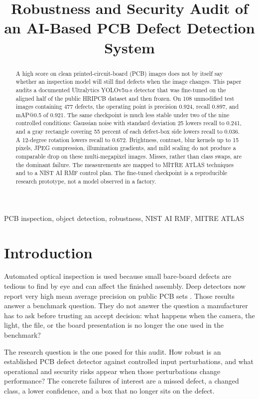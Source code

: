 \documentclass[conference]{IEEEtran}
\title{Robustness and Security Audit of an AI-Based PCB Defect Detection System}
\author{
\IEEEauthorblockN{Nirupam Narayana Maladi and Surbhi Singh}
\IEEEauthorblockA{Department of Computer Engineering\\
San Jose State University, San Jose, California 95192\\
Email: \{nirupamnarayana.maladi, surbhi.singh\}@sjsu.edu}
}
\begin{document}
\maketitle

\begin{abstract}
A high score on clean printed-circuit-board (PCB) images does not by itself say whether an inspection model will still find defects when the image changes. This paper audits a documented Ultralytics YOLOv5u-s detector that was fine-tuned on the aligned half of the public HRIPCB dataset and then frozen. On 108 unmodified test images containing 477 defects, the operating point is precision 0.924, recall 0.897, and mAP@0.5 of 0.921. The same checkpoint is much less stable under two of the nine controlled conditions: Gaussian noise with standard deviation 25 lowers recall to 0.241, and a gray rectangle covering 55 percent of each defect-box side lowers recall to 0.036. A 12-degree rotation lowers recall to 0.672. Brightness, contrast, blur kernels up to 15 pixels, JPEG compression, illumination gradients, and mild scaling do not produce a comparable drop on these multi-megapixel images. Misses, rather than class swaps, are the dominant failure. The measurements are mapped to MITRE ATLAS techniques and to a NIST AI RMF control plan. The fine-tuned checkpoint is a reproducible research prototype, not a model observed in a factory.
\end{abstract}

\begin{IEEEkeywords}
PCB inspection, object detection, robustness, NIST AI RMF, MITRE ATLAS
\end{IEEEkeywords}

\section{Introduction}
Automated optical inspection is used because small bare-board defects are tedious to find by eye and can affect the finished assembly. Deep detectors now report very high mean average precision on public PCB sets \cite{tang2019deeppcb,niu2023yolov5,xiao2024cdiyolo}. Those results answer a benchmark question. They do not answer the question a manufacturer has to ask before trusting an accept decision: what happens when the camera, the light, the file, or the board presentation is no longer the one used in the benchmark?

The research question is the one posed for this audit. How robust is an established PCB defect detector against controlled input perturbations, and what operational and security risks appear when those perturbations change performance? The concrete failures of interest are a missed defect, a changed class, a lower confidence, and a box that no longer sits on the defect.
\end{document}

